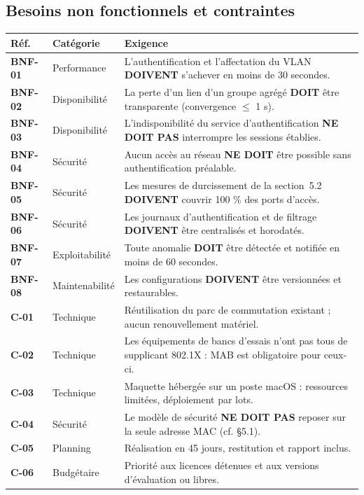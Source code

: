 \documentclass[11pt,a4paper]{article}
\newcommand{\rid}[1]{\textcolor{primary}{\textbf{\small #1}}}
\begin{document}
\subsection{Besoins non fonctionnels et contraintes}
\begin{table}[H]
\centering
\begin{tabularx}{\textwidth}{L{1.6cm} L{2.7cm} Y}
\toprule
{}\textbf{Réf.} & \textbf{Catégorie} & \textbf{Exigence} \\
\midrule
\rid{BNF-01} & Performance & L'authentification et l'affectation du VLAN \textbf{DOIVENT} s'achever en moins de 30 secondes. \\
\rid{BNF-02} & Disponibilité & La perte d'un lien d'un groupe agrégé \textbf{DOIT} être transparente (convergence $\leq$ 1 s). \\
\rid{BNF-03} & Disponibilité & L'indisponibilité du service d'authentification \textbf{NE DOIT PAS} interrompre les sessions établies. \\
\rid{BNF-04} & Sécurité & Aucun accès au réseau \textbf{NE DOIT} être possible sans authentification préalable. \\
\rid{BNF-05} & Sécurité & Les mesures de durcissement de la section~5.2 \textbf{DOIVENT} couvrir 100 \% des ports d'accès. \\
\rid{BNF-06} & Sécurité & Les journaux d'authentification et de filtrage \textbf{DOIVENT} être centralisés et horodatés. \\
\rid{BNF-07} & Exploitabilité & Toute anomalie \textbf{DOIT} être détectée et notifiée en moins de 60 secondes. \\
\rid{BNF-08} & Maintenabilité & Les configurations \textbf{DOIVENT} être versionnées et restaurables. \\
\midrule
\rid{C-01} & Technique & Réutilisation du parc de commutation existant ; aucun renouvellement matériel. \\
\rid{C-02} & Technique & Les équipements de bancs d'essais n'ont pas tous de supplicant 802.1X : MAB est obligatoire pour ceux-ci. \\
\rid{C-03} & Technique & Maquette hébergée sur un poste macOS : ressources limitées, déploiement par lots. \\
\rid{C-04} & Sécurité & Le modèle de sécurité \textbf{NE DOIT PAS} reposer sur la seule adresse MAC (cf. \S5.1). \\
\rid{C-05} & Planning & Réalisation en 45 jours, restitution et rapport inclus. \\
\rid{C-06} & Budgétaire & Priorité aux licences détenues et aux versions d'évaluation ou libres. \\
\bottomrule
\end{tabularx}
\end{table}
\end{document}
